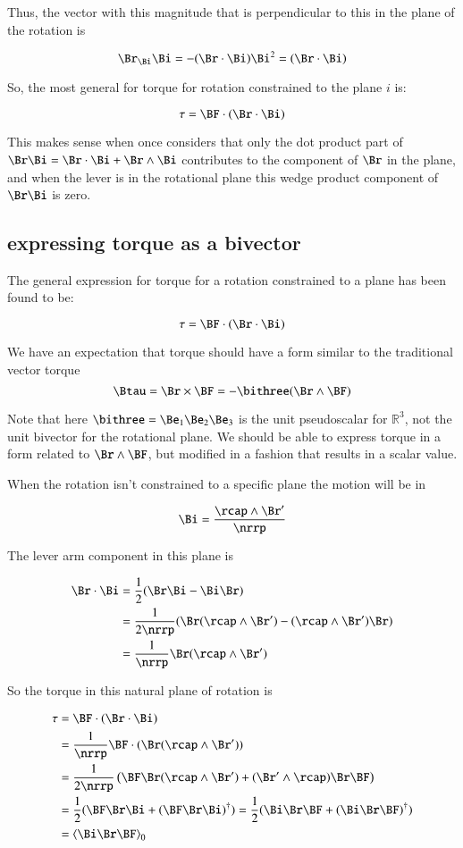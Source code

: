 Thus, the vector with this magnitude that is perpendicular to this in the plane of the rotation  is

\[
\Br _{\Bi } \Bi  
=  -(\Br  \cdot \Bi ) \Bi ^2
=  (\Br  \cdot \Bi ) 
\]

So, the most general for torque for rotation constrained to the plane $i$ is:

\[
\tau
=  \BF  \cdot (\Br  \cdot \Bi ) 
\]

This makes sense when once considers that only the dot product part of $\Br  \Bi  = \Br  \cdot \Bi  + \Br  \wedge \Bi $ contributes to the component of $\Br $ in the plane, and when the lever is in the rotational plane this wedge product component of 
$\Br \Bi $ is zero.

\subsection{expressing torque as a bivector}

The general expression for torque for a rotation constrained to a plane has been found to be:

\[
\tau
=  \BF  \cdot (\Br  \cdot \Bi ) 
\]

We have an expectation that torque should have a form similar to the traditional vector torque
\[
\Btau = \Br \times \BF = -\bithree (\Br \wedge \BF)
\]

Note that here $\bithree = \Be_1 \Be_2 \Be_3 $ is the unit pseudoscalar for $\mathbb{R}^3$, not the unit bivector for the rotational plane.
We should be able to express torque in a form related to $\Br \wedge \BF$, but modified
in a fashion that results in a scalar value.

When the rotation isn't constrained to a specific plane the motion will be in

\[
\Bi = \frac{\rcap \wedge \Br'}{\nrrp}
\]

The lever arm component in this plane is

\begin{align*}
\Br \cdot \Bi
   &= \frac{1}{2}           (\Br \Bi - \Bi \Br) \\
   &= \frac{1}{2\nrrp} (\Br (\rcap \wedge \Br') - (\rcap \wedge \Br') \Br) \\
   &= \frac{1}{\nrrp}   \Br (\rcap \wedge \Br') \\
\end{align*}

So the torque in this natural plane of rotation is

\begin{align*}
\tau 
   &=  \BF  \cdot (\Br  \cdot \Bi )  \\
   &=  \frac{1}{\nrrp}     \BF \cdot ( \Br (\rcap \wedge \Br') ) \\
   &=  \frac{1}{2 \nrrp} \left(    \BF \Br (\rcap \wedge \Br') + (\Br' \wedge \rcap) \Br \BF    \right)\\
   &=  \frac{1}{2} ( \BF \Br \Bi + (\BF \Br \Bi)^\dagger ) = \frac{1}{2} ( \Bi \Br \BF + (\Bi \Br \BF)^\dagger ) \\
   &=  {\langle \Bi \Br \BF \rangle}_0
\end{align*}


